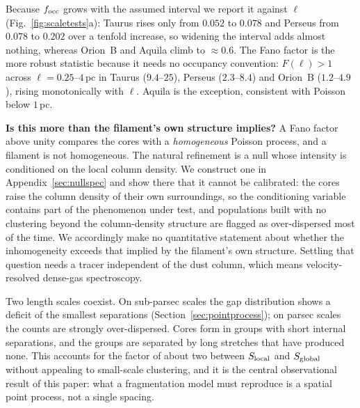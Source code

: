 \documentclass[usenatbib,twoside,twocolumn]{mnras}
\begin{document}
Because $f_{\rm occ}$ grows with the assumed interval we report it against $\ell$ (Fig.~\ref{fig:scaletests}a): Taurus rises only from $0.052$ to $0.078$ and Perseus from $0.078$ to $0.202$ over a tenfold increase, so widening the interval adds almost nothing, whereas Orion~B and Aquila climb to $\approx0.6$. The Fano factor is the more robust statistic because it needs no occupancy convention: $F(\ell)>1$ across $\ell=0.25$--$4$\,pc in Taurus ($9.4$--$25$), Perseus ($2.3$--$8.4$) and Orion~B ($1.2$--$4.9$), rising monotonically with $\ell$. Aquila is the exception, consistent with Poisson below $1$\,pc.

\smallskip\noindent\textbf{Is this more than the filament's own structure implies?} A Fano factor above unity compares the cores with a \emph{homogeneous} Poisson process, and a filament is not homogeneous. The natural refinement is a null whose intensity is conditioned on the local column density. We construct one in Appendix~\ref{sec:nullspec} and show there that it cannot be calibrated: the cores raise the column density of their own surroundings, so the conditioning variable contains part of the phenomenon under test, and populations built with no clustering beyond the column-density structure are flagged as over-dispersed most of the time. We accordingly make no quantitative statement about whether the inhomogeneity exceeds that implied by the filament's own structure. Settling that question needs a tracer independent of the dust column, which means velocity-resolved dense-gas spectroscopy.

Two length scales coexist. On sub-parsec scales the gap distribution shows a deficit of the smallest separations (Section~\ref{sec:pointprocess}); on parsec scales the counts are strongly over-dispersed. Cores form in groups with short internal separations, and the groups are separated by long stretches that have produced none. This accounts for the factor of about two between $S_{\rm local}$ and $S_{\rm global}$ without appealing to small-scale clustering, and it is the central observational result of this paper: what a fragmentation model must reproduce is a spatial point process, not a single spacing.
\end{document}
